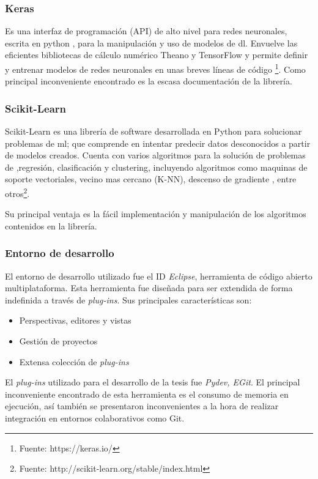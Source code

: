 \subsubsection*{Keras}

Es una interfaz de programación (API) de alto nivel para redes neuronales, escrita en python , para la manipulación y uso de modelos de \ac{dl}. Envuelve las eficientes bibliotecas de cálculo numérico Theano y TensorFlow y permite definir y entrenar modelos de redes neuronales en unas breves líneas de código \footnote{Fuente:  https://keras.io/}. Como principal inconveniente encontrado es la escasa documentación de la librería.

\subsubsection*{Scikit-Learn}\label{sub:sklearn}
Scikit-Learn es una librería de software desarrollada en Python para solucionar problemas de \ac{ml}; que comprende en intentar predecir datos desconocidos a partir de modelos creados. Cuenta con varios algoritmos para la solución de problemas de ,regresión, clasificación y clustering, incluyendo algoritmos como maquinas de soporte vectoriales, vecino mas cercano (K-NN), descenso de gradiente , entre otros\footnote{Fuente: http://scikit-learn.org/stable/index.html}.

Su principal ventaja es la fácil implementación y manipulación de los algoritmos contenidos en la librería.

\subsubsection*{Entorno de desarrollo}
El entorno de desarrollo utilizado fue el ID \textit{Eclipse}, herramienta de código abierto multiplataforma. Esta herramienta fue diseñada para ser extendida de forma indefinida a través de \textit{plug-ins}. Sus principales características son:
\begin{itemize}
 \item Perspectivas, editores y vistas
 \item Gestión de proyectos
 \item Extensa colección de \textit{plug-ins}
\end{itemize}
El \textit{plug-ins} utilizado para el desarrollo de la tesis fue \textit{Pydev, EGit}. El principal inconveniente encontrado de esta herramienta es 
el consumo de memoria en ejecución, así también se presentaron inconvenientes a la hora de realizar integración en entornos colaborativos como Git.

